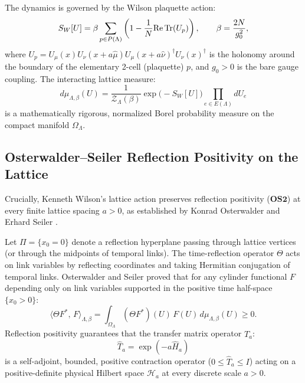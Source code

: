 The dynamics is governed by the Wilson plaquette action:
\begin{equation}
\label{eq:wilson_action_intro}
S_W[U] = \beta \sum_{p \in P(\Lambda)} \left( 1 - \frac{1}{N} \mathrm{Re} \, \mathrm{Tr}(U_p) \right), \qquad \beta = \frac{2N}{g_0^2},
\end{equation}
where $U_p = U_\mu(x) U_\nu(x + a\hat{\mu}) U_\mu(x + a\hat{\nu})^\dagger U_\nu(x)^\dagger$ is the holonomy around the boundary of the elementary 2-cell (plaquette) $p$, and $g_0 > 0$ is the bare gauge coupling. The interacting lattice measure:
\begin{equation}
d\mu_{\Lambda, \beta}(U) = \frac{1}{\mathcal{Z}_\Lambda(\beta)} \exp\bigl( -S_W[U] \bigr) \prod_{e \in E(\Lambda)} dU_e
\end{equation}
is a mathematically rigorous, normalized Borel probability measure on the compact manifold $\Omega_\Lambda$.

\subsection{Osterwalder--Seiler Reflection Positivity on the Lattice}
\label{subsec:os_lattice_reflection}
Crucially, Kenneth Wilson's lattice action preserves reflection positivity ($\mathbf{OS2}$) at every finite lattice spacing $a > 0$, as established by Konrad Osterwalder and Erhard Seiler \cite{OsterwalderSeiler1978}. 

Let $\Pi = \{x_0 = 0\}$ denote a reflection hyperplane passing through lattice vertices (or through the midpoints of temporal links). The time-reflection operator $\Theta$ acts on link variables by reflecting coordinates and taking Hermitian conjugation of temporal links. Osterwalder and Seiler proved that for any cylinder functional $F$ depending only on link variables supported in the positive time half-space $\{x_0 > 0\}$:
\begin{equation}
\label{eq:lattice_reflection_positivity_intro}
\langle \Theta F^*, \, F \rangle_{\Lambda, \beta} = \int_{\Omega_\Lambda} (\Theta F^*)(U) \, F(U) \, d\mu_{\Lambda, \beta}(U) \ge 0.
\end{equation}
Reflection positivity guarantees that the transfer matrix operator $\hat{T}_a$:
\begin{equation}
\hat{T}_a = \exp( -a \hat{H}_a )
\end{equation}
is a self-adjoint, bounded, positive contraction operator ($0 \le \hat{T}_a \le I$) acting on a positive-definite physical Hilbert space $\mathcal{H}_a$ at every discrete scale $a > 0$.

